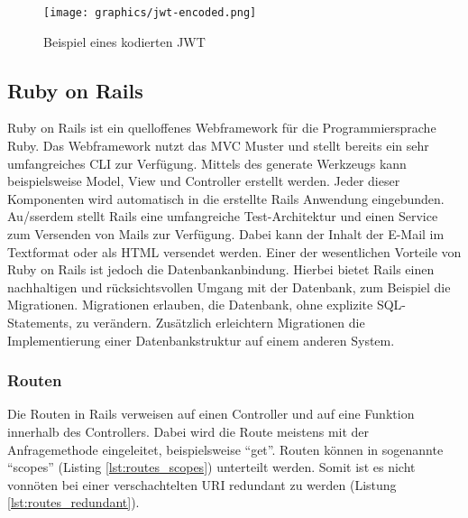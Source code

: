 \begin{figure}[h]
	\centering
	\texttt{[image: graphics/jwt-encoded.png]}
	\caption{Beispiel eines kodierten \gls{JWT} }
	\label{fig:jwt-encoded}
\end{figure}

\subsection{Ruby on Rails}
\label{sec: rails}
Ruby on Rails ist ein quelloffenes Webframework für die Programmiersprache Ruby. Das Webframework nutzt das \gls{MVC} Muster und stellt bereits ein sehr umfangreiches \gls{CLI} zur Verfügung. Mittels des generate Werkzeugs kann beispielsweise Model, View und Controller erstellt werden. Jeder dieser Komponenten wird automatisch in die erstellte Rails Anwendung eingebunden. Au{/ss}erdem stellt Rails eine umfangreiche Test-Architektur und einen Service zum Versenden von Mails zur Verfügung. Dabei kann der Inhalt der E-Mail im Textformat oder als \gls{HTML} versendet werden. Einer der wesentlichen Vorteile von Ruby on Rails ist jedoch die Datenbankanbindung. Hierbei bietet Rails einen nachhaltigen und rücksichtsvollen Umgang mit der Datenbank, zum Beispiel die Migrationen. Migrationen erlauben, die Datenbank, ohne explizite SQL-Statements, zu verändern. Zusätzlich erleichtern Migrationen die Implementierung einer Datenbankstruktur auf einem anderen System.

\subsubsection{Routen}
\label{sec: routen}
Die Routen in Rails verweisen auf einen Controller und auf eine Funktion innerhalb des Controllers. Dabei wird die Route meistens mit der Anfragemethode eingeleitet, beispielsweise \enquote{get}. Routen können in sogenannte \enquote{scopes} (Listing \ref{lst:routes_scopes}) unterteilt werden. Somit ist es nicht vonnöten bei einer verschachtelten \gls{URI} redundant zu werden (Listung \ref{lst:routes_redundant}).

\begin{minipage}{\linewidth}
	
\end{minipage}

\begin{minipage}{\linewidth}
	
\end{minipage}


